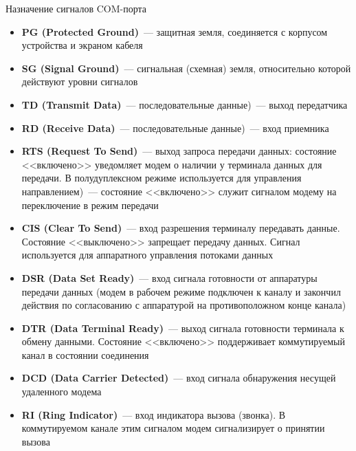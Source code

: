 \documentclass[aspectratio=169,14pt]{beamer}
\begin{document}
\begin{frame}{Назначение сигналов COM-порта}
    \begin{tiny}
        \begin{spacing}{0.8}
            \begin{itemize}
                \item \textbf{PG (Protected Ground)}~--- защитная земля, соединяется с
                корпусом устройства и экраном кабеля
                \item \textbf{SG (Signal Ground)}~--- сигнальная (схемная) земля,
                относительно которой действуют уровни сигналов
                \item \textbf{TD (Transmit Data)}~--- последовательные данные)~--- выход
                передатчика
                \item \textbf{RD (Receive Data)}~--- последовательные данные)~--- вход
                приемника
                \item \textbf{RTS (Request To Send)}~--- выход запроса передачи данных:
                состояние <<включено>> уведомляет модем о наличии у терминала
                данных для передачи. В полудуплексном режиме используется для
                управления направлением)~--- состояние <<включено>> служит
                сигналом модему на переключение в режим передачи
                \item \textbf{CIS (Clear To Send)}~--- вход разрешения терминалу
                передавать данные. Состояние <<выключено>> запрещает передачу
                данных. Сигнал используется для аппаратного управления
                потоками данных
                \item \textbf{DSR (Data Set Ready)}~--- вход сигнала готовности от
                аппаратуры передачи данных (модем в рабочем режиме подключен к
                каналу и закончил действия по согласованию с аппаратурой на
                противоположном конце канала)
                \item \textbf{DTR (Data Terminal Ready)}~--- выход сигнала готовности
                терминала к обмену данными. Состояние <<включено>> поддерживает
                коммутируемый канал в состоянии соединения
                \item \textbf{DCD (Data Carrier Detected)}~--- вход сигнала обнаружения
                несущей удаленного модема
                \item \textbf{RI (Ring Indicator)}~--- вход индикатора вызова (звонка). В коммутируемом канале этим сигналом модем сигнализирует о принятии вызова
            \end{itemize}
        \end{spacing}
    \end{tiny}
\end{frame}
\end{document}
